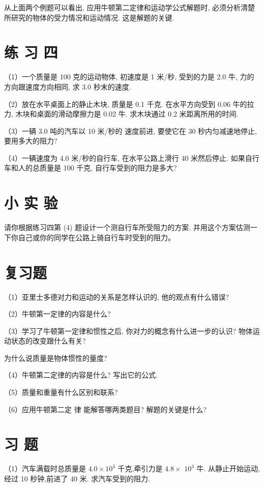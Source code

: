 \documentclass[10pt]{article}
\begin{document}
从上面两个例题可以看出, 应用牛顿第二定律和运动学公式解题时, 必须分析清楚所研究的物体的受力情况和运动情况. 这是解题的关键.

\section*{练 习 四}

（1）一个质量是 100 克的运动物体, 初速度是 1 米/秒, 受到的力是 2.0 牛, 力的方向跟速度方向相同, 求 3.0 秒末的速度.

（2）放在水平桌面上的静止木块, 质量是 0.1 千克. 在水平方向受到 0.06 牛的拉力, 木块和桌面的滑动摩擦力是 0.02 牛. 求木块通过 0.2 米距离所用的时间.

（3）一辆 3.0 吨的汽车以 10 米/秒的 速度前进, 要使它在 30 秒内匀减速地停止, 要用多大的阻力?

（4）一辆速度为 4.0 米/秒的自行车, 在水平公路上滑行 40 米然后停止. 如果自行车和人的总质量是 100 千克, 自行车受到的阻力是多大?

\section*{小 实 验}

请你根据练习四第 (4) 题设计一个测自行车所受阻力的方案. 并用这个方案估测一下你自己或你的同学在公路上骑自行车时受到的阻力。

\section*{复习题}

（1）亚里士多德对力和运动的关系是怎样认识的, 他的观点有什么错误?

（2）牛顿第一定律的内容是什么?

（3）学习了牛顿第一定律和惯性之后, 你对力的概念有什么进一步的认识? 物体运动状态的改变跟什么有关?

为什么说质量是物体惯性的量度?

（4）牛顿第二定律的内容是什么? 写出它的公式.

（5）质量和重量有什么区别和联系?

（6）应用牛顿第二定 律 能解答哪两类题目? 解题的关键是什么?

\section*{习 题}

（1）汽车满载时总质量是 \({4.0} \times {10}^{3}\) 千克,牵引力是 \({4.8} \times\) \({10}^{3}\) 牛. 从静止开始运动,经过 10 秒钟,前进了 40 米. 求汽车受到的阻力.
\end{document}
